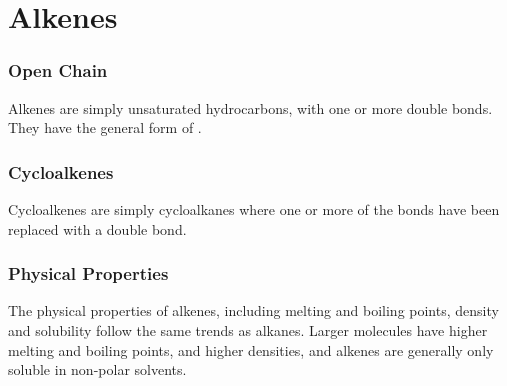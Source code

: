 

\pagebreak
\hypertarget{ChapterAlkenes}{}
\part{Alkenes}

	\section{Open Chain}

		Alkenes are simply unsaturated hydrocarbons, with one or more double bonds. They have the general form of
		.



	\section{Cycloalkenes}

		Cycloalkenes are simply cycloalkanes where one or more of the  bonds have been replaced with a  double
		bond.



	\section{Physical Properties}

		The physical properties of alkenes, including melting and boiling points, density and solubility follow the
		same trends as alkanes. Larger molecules have higher melting and boiling points, and higher densities, and alkenes are
		generally only soluble in non-polar solvents.


	\pagebreak
